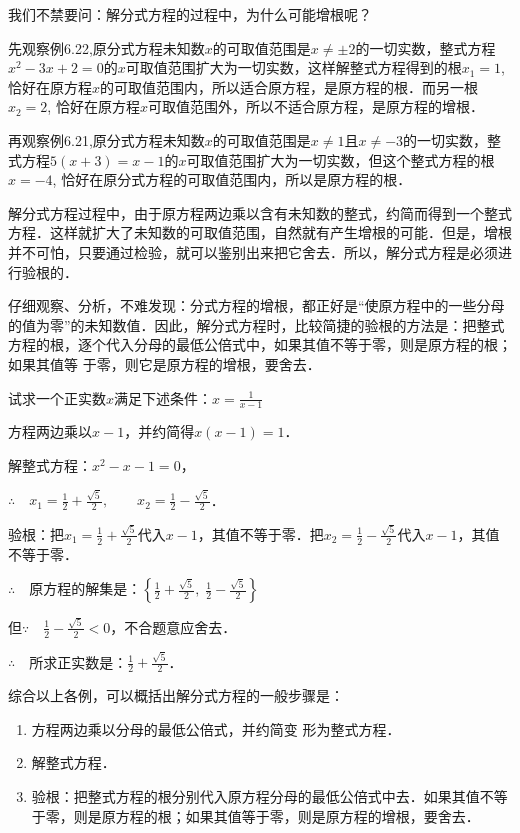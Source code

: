 我们不禁要问：解分式方程的过程中，为什么可能增根呢？

先观察例6.22,原分式方程未知数$x$的可取值范围是$x\ne \pm2$的一切实数，整式方程$x^2-3x+2=0$的$x$可取值范围扩大为一切实数，这样解整式方程得到的根$x_1=1$, 恰好在原方程$x$的可取值范围内，所以适合原方程，是原方程的根．而另一根$x_2=2$, 恰好在原方程$x$可取值范围外，所以不适合原方程，是原方程的增根．

再观察例6.21,原分式方程未知数$x$的可取值范围是$x\ne 1$且$x\ne -3$的一切实数，整式方程$5(x+3)=x-1$的$x$可取值范围扩大为一切实数，但这个整式方程的根$x=-4$, 恰好在原分式方程的可取值范围内，所以是原方程的根．

解分式方程过程中，由于原方程两边乘以含有未知数的整式，约简而得到一个整式方程．这样就扩大了未知数的可取值范围，自然就有产生增根的可能．但是，增根并不可怕，只要通过检验，就可以鉴别出来把它舍去．所以，解分式方程是必须进行验根的．

仔细观察、分析，不难发现：分式方程的增根，都正好是“使原方程中的一些分母的值为零”的未知数值．因此，解分式方程时，比较简捷的验根的方法是：把整式方程的根，逐个代入分母的最低公倍式中，如果其值不等于零，则是原方程的根；如果其值等
于零，则它是原方程的增根，要舍去．


\begin{example}
    试求一个正实数$x$满足下述条件：$x=\frac{1}{x-1}$
\end{example}

\begin{solution}
方程两边乘以$x-1$，并约简得$x(x-1)=1$．

解整式方程：$x^2-x-1=0$，

$\therefore\quad x_1=\frac{1}{2}+\frac{\sqrt{5}}{2},\qquad x_2=\frac{1}{2}-\frac{\sqrt{5}}{2}$．

验根：把$x_1=\frac{1}{2}+\frac{\sqrt{5}}{2}$代入$x-1$，其值不等于零．把$x_2=\frac{1}{2}-\frac{\sqrt{5}}{2}$代入$x-1$，其值不等于零．

$\therefore\quad $原方程的解集是：$\left\{\frac{1}{2}+\frac{\sqrt{5}}{2},\; \frac{1}{2}-\frac{\sqrt{5}}{2}\right\}$

但$\because\quad \frac{1}{2}-\frac{\sqrt{5}}{2}<0$，不合题意应舍去．

$\therefore\quad $所求正实数是：$\frac{1}{2}+\frac{\sqrt{5}}{2}$．
\end{solution}

综合以上各例，可以概括出解分式方程的一般步骤是：
\begin{enumerate}
    \item 方程两边乘以分母的最低公倍式，并约简变
形为整式方程．
\item 解整式方程．
\item 验根：把整式方程的根分别代入原方程分母的最低公倍式中去．如果其值不等于零，则是原方程的根；如果其值等于零，则是原方程的增根，要舍去．
\end{enumerate}

